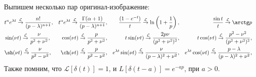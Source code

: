  Выпишем несколько пар оригинал-изображение:
\begin{align*}
    &t^n e^{\lambda t}
     \overset{\mathcal L}{\to}
        \frac{n!}{(p-\lambda)^{n+1}},
    &t^\alpha e^{\lambda t}
     \overset{\mathcal L}{\to}
        \frac{\Gamma(\alpha+1)}{(p-\lambda)^{n+1}},
    &&\frac{\left(1-e^{-t}\right)}{t}
     \overset{\mathcal L}{\to}
        \ln \left(1 + \frac{1}{p}\right),
    &&\frac{\sin t}{t}
     \overset{\mathcal L}{\to}
        \arctg p
    \\
    &\sin(\nu t)
     \overset{\mathcal L}{\to}
        \frac{\nu}{p^2 + \nu^2},
    &\cos(\nu t)
     \overset{\mathcal L}{\to}
        \frac{p}{p^2 + \nu^2},
    &&t \sin(\nu t)
     \overset{\mathcal L}{\to}
        \frac{2 p \nu}{(p^2 + \nu^2)^2}, 
    &&t \cos (\nu t)
     \overset{\mathcal L}{\to}
        \frac{p^2 - \nu^2}{(p^2 + \nu^2)^2}, \\
    &\sh(\nu t)
     \overset{\mathcal L}{\to}
        \frac{\nu}{p^2 - \nu^2},
    &\ch(\nu t)
     \overset{\mathcal L}{\to}
        \frac{p}{p^2 - \nu^2},
    &&e^{\lambda t} \sin(\nu t)
     \overset{\mathcal L}{\to}
        \frac{\nu}{(p-\lambda)^2 + \nu^2}, 
    &&e^{\lambda t} \cos(\nu t)
     \overset{\mathcal L}{\to}
        \frac{p-\lambda}{(p-\lambda)^2 + \nu^2}, 
\end{align*}
Также помним, что $\mathcal L [\delta(t)] = 1$, и $L[\delta(t-a)] = e^{-ap}$, при $a > 0$. 

